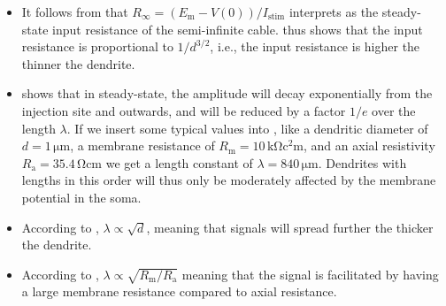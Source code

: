 \begin{itemize}
\item It follows from  that $R_{\infty} = (E_\text{m}-V(0))/I_\text{stim}$ interprets as the steady-state input resistance of the semi-infinite cable.  thus shows that the input resistance is proportional to $1/d^{3/2}$, i.e., the input resistance is higher the thinner the dendrite. 

\item {} shows that in steady-state, the amplitude will decay exponentially from the injection site and outwards, and will be reduced by a factor $1/e$ over the length $\lambda$. If we insert some typical values into , like a dendritic diameter of $d=1 \, \si{\micro\metre}$, a membrane resistance of $R_\text{m}=10 \,
\si{\kilo\ohm\square\centi\metre}$, and an axial resistivity $R_\text{a}=35.4\, \si{\ohm\centi\metre}$ we get a length constant of $\lambda = 840\, \si{\micro\metre}$. Dendrites with lengths in this order will thus only be moderately affected by the membrane potential in the soma. 

\item According to , $\lambda \propto \sqrt{d}$, meaning that signals will spread further the thicker the dendrite.

\item According to , $\lambda \propto \sqrt{R_\text{m}/R_\text{a}}$ meaning that the signal is facilitated by having a large membrane resistance compared to axial resistance. 
\end{itemize}



